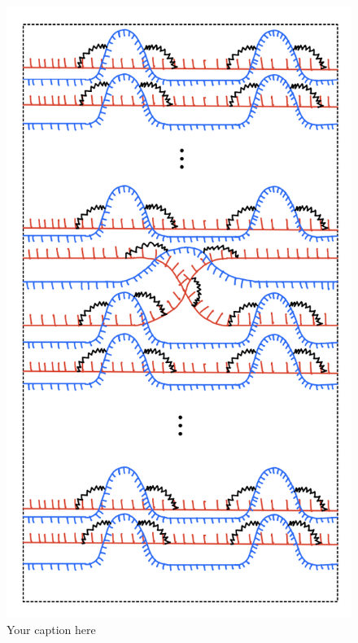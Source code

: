 \begin{figure}[H] %
    \centering
    \includegraphics[scale = 0.95]{diagrams/local_systems_on_as_diagrams/2.png} %
    \caption{Your caption here}
    \label{fig:your-label}
\end{figure}


